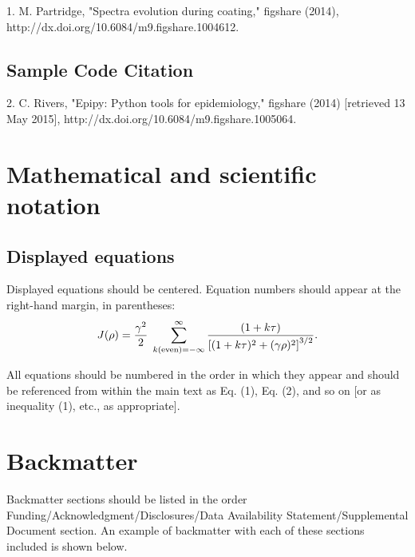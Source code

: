 \documentclass{../packages/optica-article}
\begin{document}
1. M. Partridge, "Spectra evolution during coating," figshare (2014), http://dx.doi.org/10.6084/m9.figshare.1004612.

\subsection{Sample Code Citation}

2. C. Rivers, "Epipy: Python tools for epidemiology," figshare (2014) [retrieved 13 May 2015], http://dx.doi.org/10.6084/m9.figshare.1005064.



\section{Mathematical and scientific notation}

\subsection{Displayed equations} Displayed equations should be centered.
Equation numbers should appear at the right-hand margin, in
parentheses:
\begin{equation}
	J(\rho) =
	\frac{\gamma^2}{2} \; \sum_{k({\rm even}) = -\infty}^{\infty}
	\frac{(1 + k \tau)}{ \left[ (1 + k \tau)^2 + (\gamma  \rho)^2  \right]^{3/2} }.
\end{equation}

All equations should be numbered in the order in which they appear
and should be referenced  from within the main text as Eq. (1),
Eq. (2), and so on [or as inequality (1), etc., as appropriate].

\section{Backmatter}

Backmatter sections should be listed in the order Funding/Acknowledgment/Disclosures/Data Availability Statement/Supplemental Document section. An example of backmatter with each of these sections included is shown below.
\end{document}
